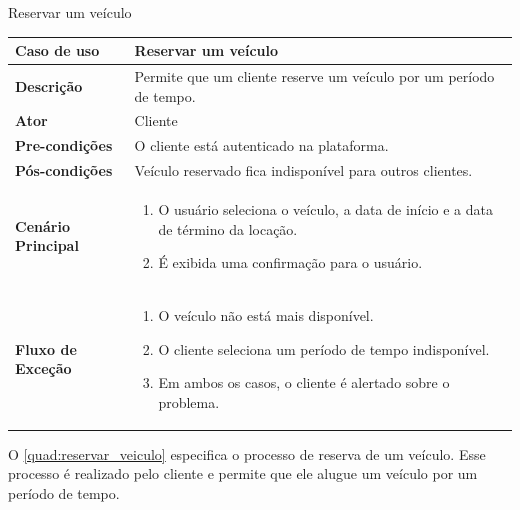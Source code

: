 \begin{quadro}[H]
    \centering
    \caption{Reservar um veículo}
    \label{quad:reservar_veiculo}
    \begin{tabular}{|p{1.2in}|p{3.5in}|}
    \hline
    
    \textbf{Caso de uso} & Reservar um veículo \\ \hline
    \textbf{Descrição} & Permite que um cliente reserve um veículo por um período de tempo. \\ \hline
    \textbf{Ator} & Cliente \\ \hline
    \textbf{Pre-condições} & O cliente está autenticado na plataforma. \\ \hline
    \textbf{Pós-condições} & Veículo reservado fica indisponível para outros clientes. \\ \hline
    \textbf{Cenário Principal} & \begin{enumerate}
        \item O usuário seleciona o veículo, a data de início e a data de término da locação.
        \item É exibida uma confirmação para o usuário.
    \end{enumerate}  \\ \hline
    \textbf{Fluxo de Exceção} & \begin{enumerate}
        \item O veículo não está mais disponível.
        \item O cliente seleciona um período de tempo indisponível.  
        \item Em ambos os casos, o cliente é alertado sobre o problema.
    \end{enumerate}  \\ \hline
    \end{tabular} 
\end{quadro}

O \autoref{quad:reservar_veiculo} especifica o processo de reserva de um veículo. Esse processo é realizado pelo cliente e permite que ele alugue um veículo por um período de tempo.

